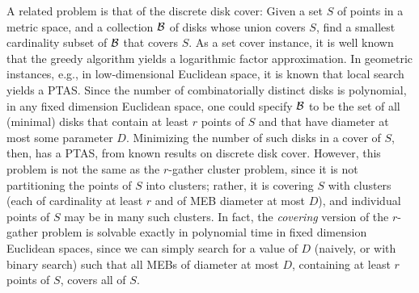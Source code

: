 A related problem is that of the discrete disk cover: Given a set $S$ of points in a metric space, and a collection ${\cal B}$ of disks whose union covers $S$, find a smallest cardinality subset of ${\cal B}$ that covers $S$.  As a set cover instance, it is well known that the greedy algorithm yields a logarithmic factor approximation.  %
In geometric instances, e.g., in low-dimensional Euclidean space, it is known that local search yields a PTAS.  %
Since the number of combinatorially distinct disks is polynomial, in any fixed dimension Euclidean space, one could specify ${\cal B}$ to be the set of all (minimal) disks that contain at least $r$ points of $S$ and that have diameter at most some parameter $D$.  Minimizing the number of such disks in a cover of $S$, then, has a PTAS, from known results on discrete disk cover.  However, this problem is not the same as the $r$-gather cluster problem, since it is not partitioning the points of $S$ into clusters; rather, it is covering $S$ with clusters (each of cardinality at least $r$ and of MEB diameter at most $D$), and individual points of $S$ may be in many such clusters.  In fact, the {\em covering} version of the $r$-gather problem is solvable exactly in polynomial time in fixed dimension Euclidean spaces, since we can simply search for a value of $D$ (naively, or with binary search) such that all MEBs of diameter at most $D$, containing at least $r$ points of $S$, covers all of $S$.


